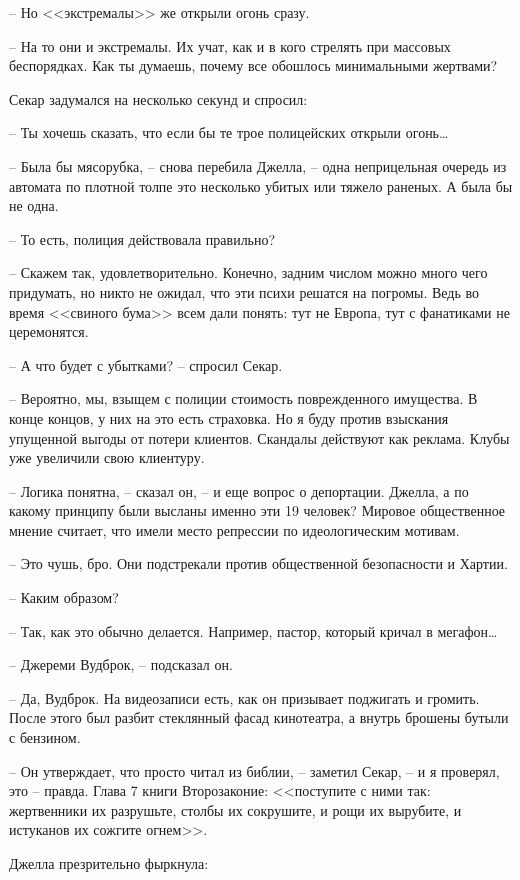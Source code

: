 -- Но <<экстремалы>> же открыли огонь сразу.

-- На то они и экстремалы. Их учат, как и в кого стрелять при массовых беспорядках. Как ты думаешь, почему все обошлось минимальными жертвами?

Секар задумался на несколько секунд и спросил:

-- Ты хочешь сказать, что если бы те трое полицейских открыли огонь\ldots{}

-- Была бы мясорубка, -- снова перебила Джелла, -- одна неприцельная очередь из автомата по плотной толпе это несколько убитых или тяжело раненых. А была бы не одна.

-- То есть, полиция действовала правильно?

-- Скажем так, удовлетворительно. Конечно, задним числом можно много чего придумать, но никто не ожидал, что эти психи решатся на погромы. Ведь во время <<свиного бума>> всем дали понять: тут не Европа, тут с фанатиками не церемонятся.

-- А что будет с убытками? -- спросил Секар.

-- Вероятно, мы, взыщем с полиции стоимость поврежденного имущества. В конце концов, у них на это есть страховка. Но я буду против взыскания упущенной выгоды от потери клиентов. Скандалы действуют как реклама. Клубы уже увеличили свою клиентуру.

-- Логика понятна, -- сказал он, -- и еще вопрос о депортации. Джелла, а по какому принципу были высланы именно эти 19 человек? Мировое общественное мнение считает, что имели место репрессии по идеологическим мотивам.

-- Это чушь, бро. Они подстрекали против общественной безопасности и Хартии.

-- Каким образом?

-- Так, как это обычно делается. Например, пастор, который кричал в мегафон\ldots{}

-- Джереми Вудброк, -- подсказал он.

-- Да, Вудброк. На видеозаписи есть, как он призывает поджигать и громить. После этого был разбит стеклянный фасад кинотеатра, а внутрь брошены бутыли с бензином.

-- Он утверждает, что просто читал из библии, -- заметил Секар, -- и я проверял, это -- правда. Глава 7 книги Второзаконие: <<поступите с ними так: жертвенники их разрушьте, столбы их сокрушите, и рощи их вырубите, и истуканов их сожгите огнем>>.

Джелла презрительно фыркнула:

